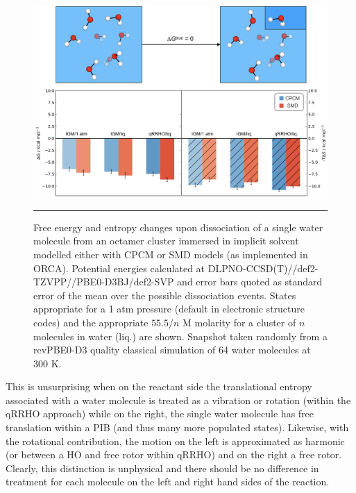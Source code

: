 \documentclass[../main.tex]{subfiles}
\begin{document}
\begin{figure}[h!]
	\centering
	\vspace{1.0cm}
	\includegraphics[width=\textwidth]{4/figs/figX2/figX2}
	\vspace{0.2cm}
	\hrule
	\caption{Free energy and entropy changes upon dissociation of a single water molecule from an octamer cluster immersed in implicit solvent modelled either with CPCM or SMD models (as implemented in ORCA). Potential energies calculated at DLPNO-CCSD(T)//def2-TZVPP//PBE0-D3BJ/def2-SVP and  error bars quoted as standard error of the mean over the possible dissociation events. States appropriate for a 1 atm pressure (default in electronic structure codes) and the appropriate $55.5/n$ M  molarity for a cluster of $n$ molecules in water (liq.) are shown. Snapshot taken randomly from a revPBE0-D3 quality classical simulation of 64 water molecules at 300 K.}
	\label{fig::entropy_X2}
\end{figure}

This is unsurprising when on the reactant side the translational entropy associated with a water molecule is treated as a vibration or rotation (within the qRRHO\cite{Grimme2012} approach) while on the right, the single water molecule has free translation within a PIB (and thus many more populated states). Likewise, with the rotational contribution, the motion on the left is approximated as harmonic (or between a HO and free rotor within qRRHO) and on the right a free rotor. Clearly, this distinction is unphysical and there should be no difference in treatment for each molecule on the left and right hand sides of the reaction.
\end{document}

